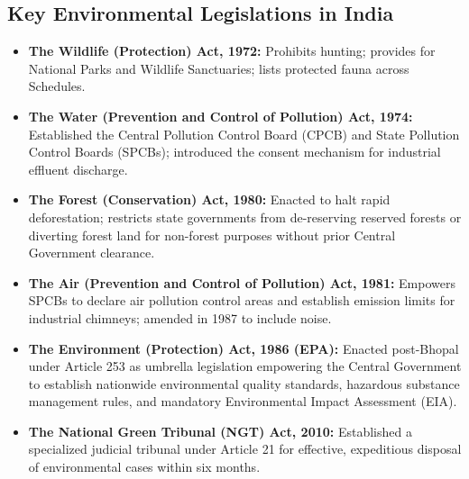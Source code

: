 \subsection{Key Environmental Legislations in India}
\begin{itemize}[leftmargin=1.5em]
    \item \textbf{The Wildlife (Protection) Act, 1972:} Prohibits hunting; provides for National Parks and Wildlife Sanctuaries; lists protected fauna across Schedules.
    \item \textbf{The Water (Prevention and Control of Pollution) Act, 1974:} Established the Central Pollution Control Board (CPCB) and State Pollution Control Boards (SPCBs); introduced the consent mechanism for industrial effluent discharge.
    \item \textbf{The Forest (Conservation) Act, 1980:} Enacted to halt rapid deforestation; restricts state governments from de-reserving reserved forests or diverting forest land for non-forest purposes without prior Central Government clearance.
    \item \textbf{The Air (Prevention and Control of Pollution) Act, 1981:} Empowers SPCBs to declare air pollution control areas and establish emission limits for industrial chimneys; amended in 1987 to include noise.
    \item \textbf{The Environment (Protection) Act, 1986 (EPA):} Enacted post-Bhopal under Article 253 as umbrella legislation empowering the Central Government to establish nationwide environmental quality standards, hazardous substance management rules, and mandatory Environmental Impact Assessment (EIA).
    \item \textbf{The National Green Tribunal (NGT) Act, 2010:} Established a specialized judicial tribunal under Article 21 for effective, expeditious disposal of environmental cases within six months.
\end{itemize}


